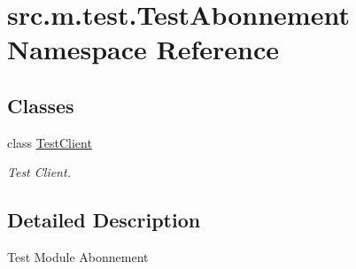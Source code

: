 \hypertarget{namespacesrc_1_1m_1_1test_1_1_test_abonnement}{}\section{src.\+m.\+test.\+Test\+Abonnement Namespace Reference}
\label{namespacesrc_1_1m_1_1test_1_1_test_abonnement}
\subsection*{Classes}
\begin{DoxyCompactItemize}
\item 
class \hyperlink{classsrc_1_1m_1_1test_1_1_test_abonnement_1_1_test_client}{Test\+Client}
\begin{DoxyCompactList}\small\item\em Test Client. \end{DoxyCompactList}\end{DoxyCompactItemize}


\subsection{Detailed Description}
\begin{DoxyVerb}    Test Module Abonnement
\end{DoxyVerb}
 